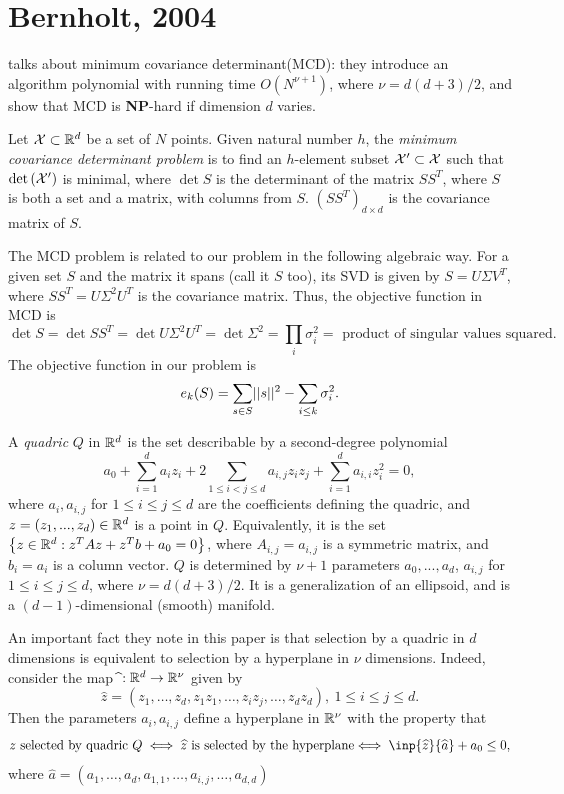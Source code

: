 \documentclass{article}
\begin{document}
\section{Bernholt, 2004}
\cite{bernholt2004complexity} talks about minimum covariance determinant(MCD): they introduce an algorithm polynomial with running time $O(N^{\nu+1})$, where $\nu = d(d+3)/2$, and show that MCD is \textbf{NP}-hard if dimension $d$ varies.

\begin{definition}[MCD]
Let $\mathcal{X}\subset \mathbb{R}^d$ be a set of $N$ points. Given natural number $h$, the \textit{minimum covariance determinant problem} is to find an $h$-element subset $\mathcal{X}'\subset \mathcal{X}$ such that $\text{det}\left(\mathcal{X}'\right)$ is minimal, where $\det{S}$ is the determinant of the matrix $SS^T$, where $S$ is both a set and a matrix, with columns from $S$. $(SS^T)_{d\times d}$ is the covariance matrix of $S$.
\end{definition}

The MCD problem is related to our problem in the following algebraic way. For a given set $S$ and the matrix it spans (call it $S$ too), its SVD is given by $S = U \Sigma V^T$, where $SS^T = U \Sigma^2 U^T$ is the covariance matrix. Thus, the objective function in MCD is $$\det{S} = \det{SS^T} = \det{U \Sigma^2 U^T} = \det{\Sigma^2} = \prod_{i}\sigma_i^2 = \text{ product of singular values squared}.$$ The objective function in our problem is $$e_k(S) = \sum_{s\in S}\norm{s}^2 - \sum_{i\leq k}\sigma_i^2.$$

\begin{definition}[Quadric]
A \textit{quadric} $Q$ in $\mathbb{R}^d$ is the set describable by a second-degree polynomial
\begin{equation}
    a_0 + \sum_{i=1}^d a_i z_i + 2\sum_{1\leq i< j\leq d} a_{i,j} z_i z_j + \sum_{i = 1}^d a_{i,i} z_i^2 = 0,
\end{equation}
where $a_i, a_{i,j}$ for $1\leq i\leq j\leq d$ are the coefficients defining the quadric, and $z = (z_1,...,z_d)\in \mathbb{R}^d$ is a point in $Q$.
Equivalently, it is the set $\left\{z\in \mathbb{R}^d : z^T A z + z^T b + a_0 = 0\right\}$, where $A_{i,j} = a_{i,j}$ is a symmetric matrix, and $b_i = a_i$ is a column vector. $Q$ is determined by $\nu+1$ parameters $a_0,...,a_d$,  $a_{i,j}$ for $1\leq i\leq j\leq d$, where $\nu = d(d+3)/2$. It is a generalization of an ellipsoid, and is a $(d-1)$-dimensional (smooth) manifold.
\end{definition}

An important fact they note in this paper is that selection by a quadric in $d$ dimensions is equivalent to selection by a hyperplane in $\nu$ dimensions. Indeed, consider the map $\mathbf{\widehat{}}: \mathbb{R}^d \to \mathbb{R}^\nu$ given by
$$\widehat{z} = (z_1,\dots,z_d, z_1z_1,\dots,z_iz_j,\dots,z_dz_d),\ 1\leq i\leq j\leq d.$$
Then the parameters $a_i,a_{i,j}$ define a hyperplane in $\mathbb{R}^\nu$ with the property that 
$$ \text{$z$ selected by quadric $Q \iff \widehat{z} $ is selected by the hyperplane$ \iff \inp{\widehat{z}}{\widehat{a}} + a_0\leq 0$}, $$
where $\widehat{a} = (a_1,\dots,a_d, a_{1,1},\dots,a_{i,j},\dots,a_{d,d})$
\end{document}
